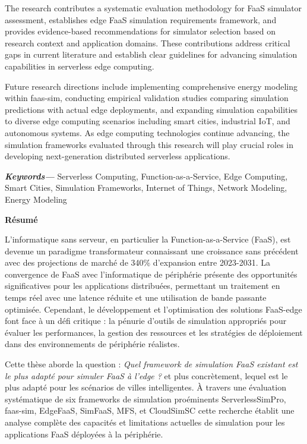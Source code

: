 The research contributes a systematic evaluation methodology for FaaS simulator assessment, establishes edge FaaS simulation requirements framework, and provides evidence-based recommendations for simulator selection based on research context and application domains. These contributions address critical gaps in current literature and establish clear guidelines for advancing simulation capabilities in serverless edge computing.

Future research directions include implementing comprehensive energy modeling within faas-sim, conducting empirical validation studies comparing simulation predictions with actual edge deployments, and expanding simulation capabilities to diverse edge computing scenarios including smart cities, industrial IoT, and autonomous systems. As edge computing technologies continue advancing, the simulation frameworks evaluated through this research will play crucial roles in developing next-generation distributed serverless applications.

\providecommand{\keywords}[1] {
  \small
  \textbf{\textit{Keywords---}} #1
}
\keywords{Serverless Computing, Function-as-a-Service, Edge Computing, Smart Cities, Simulation Frameworks, Internet of Things, Network Modeling, Energy Modeling}

\newpage

\vspace*{4cm}
\begin{center}
    {\Large\bf Résumé}
\end{center} \vskip 0.5cm

L'informatique sans serveur, en particulier la Function-as-a-Service (FaaS), est devenue un paradigme transformateur connaissant une croissance sans précédent avec des projections de marché de 340\% d'expansion entre 2023-2031. La convergence de FaaS avec l'informatique de périphérie présente des opportunités significatives pour les applications distribuées, permettant un traitement en temps réel avec une latence réduite et une utilisation de bande passante optimisée. Cependant, le développement et l'optimisation des solutions FaaS-edge font face à un défi critique : la pénurie d'outils de simulation appropriés pour évaluer les performances, la gestion des ressources et les stratégies de déploiement dans des environnements de périphérie réalistes.

Cette thèse aborde la question : \textit{Quel framework de simulation FaaS existant est le plus adapté pour simuler FaaS à l'edge ?} et plus concrètement, lequel est le plus adapté pour les scénarios de villes intelligentes. À travers une évaluation systématique de six frameworks de simulation proéminents ServerlessSimPro, faas-sim, EdgeFaaS, SimFaaS, MFS, et CloudSimSC cette recherche établit une analyse complète des capacités et limitations actuelles de simulation pour les applications FaaS déployées à la périphérie.

